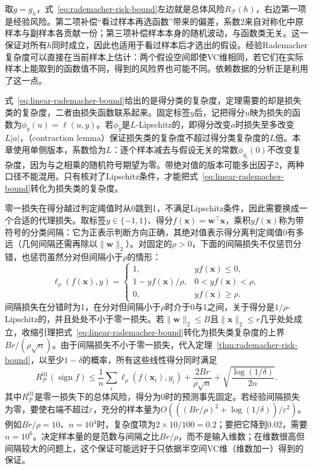取$g=g_h$，式~\eqref{eq:rademacher-risk-bound}左边就是总体风险$R_{\mathcal P}(h)$，右边第一项是经验风险。第二项补偿“看过样本再选函数”带来的偏差，系数2来自对称化中原样本与副样本各贡献一份；第三项补偿样本本身的随机波动，与函数类无关。这一保证对所有$h$同时成立，因此也适用于看过样本后才选出的假设。经验Rademacher复杂度可以直接在当前样本上估计：两个假设空间即使VC维相同，若它们在实际样本上能取到的函数值不同，得到的风险界也可能不同。依赖数据的分析正是利用了这一点。

式~\eqref{eq:linear-rademacher-bound}给出的是得分类的复杂度，定理需要的却是损失类的复杂度，二者由损失函数联系起来。固定标签$y$后，记把得分$u$映为损失的函数为$\phi_y(u)=\ell(u,y)$。若$\phi_y$是$L$-Lipschitz的，即得分改变$a$时损失至多改变$L|a|$，（contraction lemma）保证损失类的复杂度不超过得分类复杂度的$L$倍。本章使用单侧版本，系数恰为$L$：逐个样本减去与假设无关的常数$\phi_{y_i}(0)$不改变复杂度，因为与之相乘的随机符号期望为零。带绝对值的版本可能多出因子2，两种口径不能混用。只有核对了Lipschitz条件，才能把式~\eqref{eq:linear-rademacher-bound}转化为损失类的复杂度。

零一损失在得分越过判定阈值时从0跳到1，不满足Lipschitz条件，因此需要换成一个合适的代理损失。取标签$y\in\{-1,1\}$、得分$f(\bm x)=\bm w^\top\bm x$，乘积$yf(\bm x)$称为带符号的分类间隔：它为正表示判断方向正确，其绝对值表示得分离判定阈值0有多远（几何间隔还需再除以$\|\bm w\|_2$）。对固定的$\rho>0$，下面的间隔损失不仅惩罚分错，也惩罚虽然分对但间隔小于$\rho$的情形：
\[
 \ell_\rho(f(\bm x),y)=
 \begin{cases}
  1,&yf(\bm x)\leq0,\\
  1-yf(\bm x)/\rho,&0<yf(\bm x)<\rho,\\
  0,&yf(\bm x)\geq\rho.
 \end{cases}
\]
间隔损失在分错时为1，在分对但间隔小于$\rho$时介于0与1之间，关于得分是$1/\rho$-Lipschitz的，并且处处不小于零一损失。若$\|\bm w\|_2\leq B$且$\|\bm x\|_2\leq r$几乎处处成立，收缩引理把式~\eqref{eq:linear-rademacher-bound}转化为损失类复杂度的上界$Br/(\rho\sqrt n)$。由于间隔损失不小于零一损失，代入定理~\ref{thm:rademacher-risk-bound}，以至少$1-\delta$的概率，所有这些线性得分同时满足
\begin{equation}
 R_{\mathcal P}^{01}(\operatorname{sign}f)
 \leq\frac1n\sum_i\ell_\rho(f(\bm x_i),y_i)
 +\frac{2Br}{\rho\sqrt n}
 +\sqrt{\frac{\log(1/\delta)}{2n}}.
 \label{eq:rademacher-margin-risk}
\end{equation}
其中$R_{\mathcal P}^{01}$是零一损失下的总体风险，得分为0时的预测事先固定。若经验间隔损失为零，要使右端不超过$\varepsilon$，充分的样本量为$O(((Br/\rho)^2+\log(1/\delta))/\varepsilon^2)$。例如$Br/\rho=10$、$n=10^4$时，复杂度项为$2\times10/100=0.2$；要把它降到0.02，需要$n=10^6$。决定样本量的是范数与间隔之比$Br/\rho$，而不是输入维数；在维数很高但间隔较大的问题上，这个保证可能远好于只依据半空间VC维（维数加一）得到的保证。

